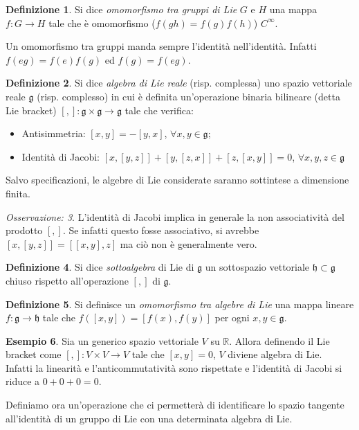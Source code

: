 \documentclass[12pt,a4paper]{report}
\theoremstyle{definition}
\newtheorem{Def}{Definizione}[chapter]
\theoremstyle{definition}
\newtheorem{Ex}[Def]{Esempio}
\theoremstyle{definition}
\theoremstyle{remark}
\newtheorem{Obs}[Def]{Osservazione:}
\begin{document}
\begin{Def}
	Si dice \textit{omomorfismo tra gruppi di Lie} $G$ e $H$ una mappa \\$f:G\rightarrow H$ tale che è omomorfismo ($f(gh)=f(g)f(h)$) $C^\infty$.
\end{Def}
Un omomorfismo tra gruppi manda sempre l'identità nell'identità. Infatti $f(eg)=f(e)f(g)$ ed $f(g)=f(eg)$.\\
\begin{Def}
	Si dice \textit{algebra di Lie reale} (risp. complessa) uno spazio vettoriale reale $\mathfrak{g}$ (risp. complesso) in cui è definita un'operazione binaria bilineare (detta Lie bracket) $[,]:\mathfrak{g}\times\mathfrak{g}\rightarrow\mathfrak{g}$ tale che verifica:
	\begin{itemize}
		\item Antisimmetria: $[x,y]=-[y,x]$, $\forall x,y\in\mathfrak{g}$;
		\item Identità di Jacobi: $[x,[y,z]]+[y,[z,x]]+[z,[x,y]]=0$, $\forall x,y,z\in \mathfrak{g}$ 
	\end{itemize}
\end{Def}
Salvo specificazioni, le algebre di Lie considerate saranno sottintese a dimensione finita.
\begin{Obs}
	L'identità di Jacobi implica in generale la non associatività del prodotto $[,]$. Se infatti questo fosse associativo, si avrebbe $[x,[y,z]]=[[x,y],z]$ ma ciò non è generalmente vero.
\end{Obs}
\begin{Def}
	Si dice \textit{sottoalgebra} di Lie di $\mathfrak{g}$ un sottospazio vettoriale $\mathfrak{h}\subset\mathfrak{g}$ chiuso rispetto all'operazione $[,]$ di $\mathfrak{g}$.
\end{Def}
\begin{Def}
	Si definisce un \textit{omomorfismo tra algebre di Lie} una mappa lineare $f:\mathfrak{g}\rightarrow\mathfrak{h}$ tale che $f([x,y])=[f(x),f(y)]$ per ogni $x,y\in\mathfrak{g}$.
\end{Def}
\begin{Ex}
	Sia un generico spazio vettoriale $V$ su $\mathbb{R}$. Allora definendo il Lie bracket come $[,]:V\times V\rightarrow V$ tale che $[x,y]=0$, $V$ diviene algebra di Lie.\\
	Infatti la linearità e l'anticommutatività sono rispettate e l'identità di Jacobi si riduce a $0+0+0=0$.
\end{Ex}
Definiamo ora un'operazione che ci permetterà di identificare lo spazio tangente all'identità di un gruppo di Lie con una determinata algebra di Lie.\\
\end{document}
